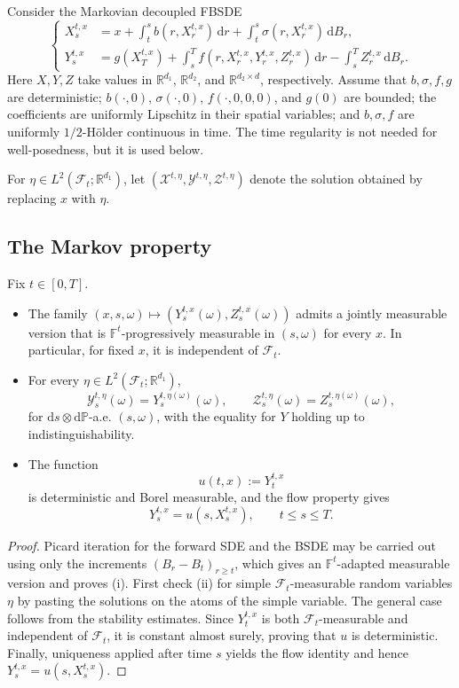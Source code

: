 Consider the Markovian decoupled FBSDE
\[
\left\{
\begin{aligned}
  X_s^{t,x}
  &=x+\int_t^s b(r,X_r^{t,x})\,\mathrm dr
      +\int_t^s\sigma(r,X_r^{t,x})\,\mathrm dB_r,\\
  Y_s^{t,x}
  &=g(X_T^{t,x})
    +\int_s^T f(r,X_r^{t,x},Y_r^{t,x},Z_r^{t,x})\,\mathrm dr
    -\int_s^T Z_r^{t,x}\,\mathrm dB_r.
\end{aligned}
\right.
\]
Here $X,Y,Z$ take values in
$\mathbb R^{d_1}$, $\mathbb R^{d_2}$, and
$\mathbb R^{d_2\times d}$, respectively.  Assume that $b,\sigma,f,g$
are deterministic; $b(\cdot,0)$, $\sigma(\cdot,0)$,
$f(\cdot,0,0,0)$, and $g(0)$ are bounded; the coefficients are uniformly
Lipschitz in their spatial variables; and $b,\sigma,f$ are uniformly
$1/2$-H\"older continuous in time.  The time regularity is not needed
for well-posedness, but it is used below.

For $\eta\in L^2(\mathcal F_t;\mathbb R^{d_1})$, let
$(\mathscr X^{t,\eta},\mathscr Y^{t,\eta},\mathscr Z^{t,\eta})$ denote the
solution obtained by replacing $x$ with $\eta$.

\subsection{The Markov property}

\begin{thm}
Fix $t\in[0,T]$.
\begin{itemize}
  \item[(i)] The family
  $(x,s,\omega)\mapsto(Y_s^{t,x}(\omega),Z_s^{t,x}(\omega))$ admits a
  jointly measurable version that is $\mathbb F^t$-progressively
  measurable in $(s,\omega)$ for every $x$.  In particular, for fixed
  $x$, it is independent of $\mathcal F_t$.
  \item[(ii)] For every
  $\eta\in L^2(\mathcal F_t;\mathbb R^{d_1})$,
  \[
    \mathscr Y_s^{t,\eta}(\omega)=Y_s^{t,\eta(\omega)}(\omega),
    \qquad
    \mathscr Z_s^{t,\eta}(\omega)=Z_s^{t,\eta(\omega)}(\omega),
  \]
  for $\mathrm ds\otimes\mathrm d\mathbb P$-a.e. $(s,\omega)$, with the
  equality for $Y$ holding up to indistinguishability.
  \item[(iii)] The function
  \[
    u(t,x):=Y_t^{t,x}
  \]
  is deterministic and Borel measurable, and the flow property gives
  \[
    Y_s^{t,x}=u(s,X_s^{t,x}),
    \qquad t\le s\le T.
  \]
\end{itemize}
\end{thm}

\begin{proof}
Picard iteration for the forward SDE and the BSDE may be carried out
using only the increments $(B_r-B_t)_{r\ge t}$, which gives an
$\mathbb F^t$-adapted measurable version and proves (i).  First check
(ii) for simple $\mathcal F_t$-measurable random variables $\eta$ by
pasting the solutions on the atoms of the simple variable.  The general
case follows from the stability estimates.  Since $Y_t^{t,x}$ is both
$\mathcal F_t$-measurable and independent of $\mathcal F_t$, it is
constant almost surely, proving that $u$ is deterministic.  Finally,
uniqueness applied after time $s$ yields the flow identity and hence
$Y_s^{t,x}=u(s,X_s^{t,x})$.
\end{proof}

